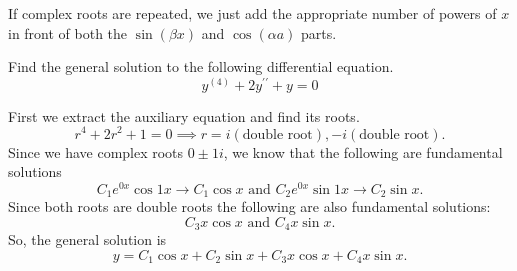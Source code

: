 \noindent
If complex roots are repeated, we just add the appropriate number of powers of $x$ in front of both the $\sin{(\beta x)}$ and $\cos{(\alpha a)}$ parts.
\pagebreak %

\begin{example}
	Find the general solution to the following differential equation.
	\begin{equation*}
		y^{(4)} + 2y^{\prime\prime} + y = 0
	\end{equation*}
\end{example}
\noindent
First we extract the auxiliary equation and find its roots.
\begin{equation*}
	r^4 + 2r^2 + 1 = 0 \implies r = i (\text{double root}), -i (\text{double root}).
\end{equation*}
Since we have complex roots $0 \pm 1i$, we know that the following are fundamental solutions
\begin{equation*}
	C_1e^{0x}\cos{1x} \to C_1\cos{x} \text{ and } C_2e^{0x}\sin{1x} \to C_2\sin{x}.
\end{equation*}
Since both roots are double roots the following are also fundamental solutions:
\begin{equation*}
	C_3x\cos{x} \text{ and } C_4x\sin{x}.
\end{equation*}
So, the general solution is
\begin{equation*}
	y = C_1\cos{x} + C_2\sin{x} + C_3x\cos{x} + C_4x\sin{x}.
\end{equation*}